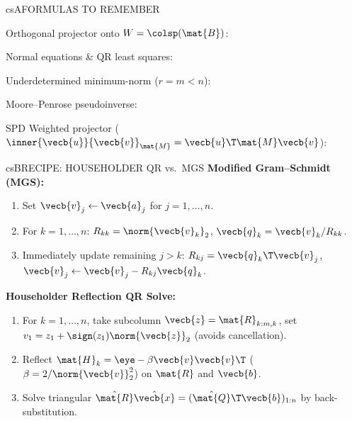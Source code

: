 \documentclass[../../../../master.tex]{subfiles}
\begin{document}

\csnextpage

\begin{cscolumns}
\begin{cscard}{csA}{FORMULAS TO REMEMBER}
  \begin{csbul}
    \item Orthogonal projector onto $W=\colsp(\mat{B})$:
    \item Normal equations \& QR least squares:
    \item Underdetermined minimum-norm ($r=m<n$):
    \item Moore--Penrose pseudoinverse:
    \item SPD Weighted projector ($\inner{\vecb{u}}{\vecb{v}}_{\mat{M}}=\vecb{u}\T\mat{M}\vecb{v}$):
  \end{csbul}
\end{cscard}

\begin{cscard}{csB}{RECIPE: HOUSEHOLDER QR vs.\ MGS}
  \textbf{Modified Gram--Schmidt (MGS):}
  \begin{enumerate}[leftmargin=1.2em, itemsep=1pt, topsep=1pt, parsep=0pt]
    \item Set $\vecb{v}_j \gets \vecb{a}_j$ for $j=1,\dots,n$.
    \item For $k=1,\dots,n$: $R_{kk}=\norm{\vecb{v}_k}_2$, $\vecb{q}_k=\vecb{v}_k/R_{kk}$.
    \item Immediately update remaining $j>k$: $R_{kj}=\vecb{q}_k\T\vecb{v}_j$, $\vecb{v}_j \gets \vecb{v}_j - R_{kj}\vecb{q}_k$.
  \end{enumerate}
  \vspace{2pt}
  \textbf{Householder Reflection QR Solve:}
  \begin{enumerate}[leftmargin=1.2em, itemsep=1pt, topsep=1pt, parsep=0pt]
    \item For $k=1,\dots,n$, take subcolumn $\vecb{z}=\mat{R}_{k:m,k}$, set $v_1 = z_1 + \sign(z_1)\norm{\vecb{z}}_2$ (avoids cancellation).
    \item Reflect $\mat{H}_k = \eye - \beta\vecb{v}\vecb{v}\T$ ($\beta=2/\norm{\vecb{v}}_2^2$) on $\mat{R}$ and $\vecb{b}$.
    \item Solve triangular $\hat{\mat{R}}\hat{\vecb{x}} = (\hat{\mat{Q}}\T\vecb{b})_{1:n}$ by back-substitution.
  \end{enumerate}
\end{cscard}
\columnbreak


\end{cscolumns}
\end{document}
